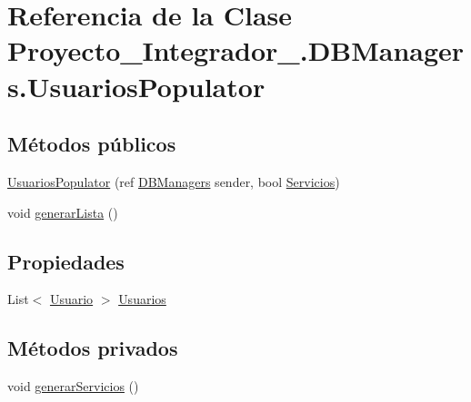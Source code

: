 \hypertarget{class_proyecto___integrador__3_1_1_d_b_managers_1_1_usuarios_populator}{\section{Referencia de la Clase Proyecto\-\_\-\-Integrador\-\_.\-D\-B\-Managers.\-Usuarios\-Populator}
\label{class_proyecto___integrador__3_1_1_d_b_managers_1_1_usuarios_populator}
}
\subsection*{Métodos públicos}
\begin{DoxyCompactItemize}
\item 
\hyperlink{class_proyecto___integrador__3_1_1_d_b_managers_1_1_usuarios_populator_ac6ee60b63a29d31bc9b7753f953c9298}{Usuarios\-Populator} (ref \hyperlink{class_proyecto___integrador__3_1_1_d_b_managers}{D\-B\-Managers} sender, bool \hyperlink{class_proyecto___integrador__3_1_1_d_b_managers_1_1_usuarios_populator_a6986794b35361485b9507cdccf8e8abe}{Servicios})
\item 
void \hyperlink{class_proyecto___integrador__3_1_1_d_b_managers_1_1_usuarios_populator_ae57a31fec3cd4b7260c4b53c2674ce4f}{generar\-Lista} ()
\end{DoxyCompactItemize}
\subsection*{Propiedades}
\begin{DoxyCompactItemize}
\item 
List$<$ \hyperlink{class_proyecto___integrador__3_1_1_tipos_dato_1_1_usuario}{Usuario} $>$ \hyperlink{class_proyecto___integrador__3_1_1_d_b_managers_1_1_usuarios_populator_adbf816391dedd5522f050c53a22319da}{Usuarios}
\end{DoxyCompactItemize}
\subsection*{Métodos privados}
\begin{DoxyCompactItemize}
\item 
void \hyperlink{class_proyecto___integrador__3_1_1_d_b_managers_1_1_usuarios_populator_a916fea74331c8233f2af0d272f59ccea}{generar\-Servicios} ()
\end{DoxyCompactItemize}
